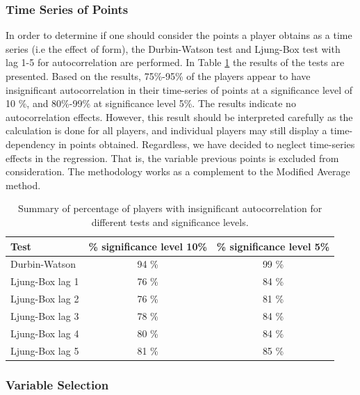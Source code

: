\subsubsection{Time Series of Points}

In order to determine if one should consider the points a player obtains as a time series (i.e the effect of form), the Durbin-Watson test and Ljung-Box test with lag 1-5 for autocorrelation are performed. In Table \ref{tab:auto_tests} the results of the tests are presented. Based on the results, 75\%-95\% of the players appear to have insignificant autocorrelation in their time-series of points at a significance level of 10 \%, and 80\%-99\% at significance level 5\%. The results indicate no autocorrelation effects. However, this result should be interpreted carefully as the calculation is done for all players, and individual players may still display a time-dependency in points obtained. Regardless, we have decided to neglect time-series effects in the regression. That is, the variable previous points is excluded from consideration. The methodology works as a complement to the Modified Average method.

\begin{table}[H]
\centering
\begin{tabular}{|l|c|c|}
\hline
Test            & \% significance level 10\% & \% significance level 5\% \\
\hline
Durbin-Watson   & 94 \% & 99 \%                                            \\
Ljung-Box lag 1 & 76 \% & 84 \%                                            \\
Ljung-Box lag 2 & 76 \% & 81 \%                                            \\
Ljung-Box lag 3 & 78 \% & 84 \%                                            \\
Ljung-Box lag 4 & 80 \% & 84 \%                                           \\
Ljung-Box lag 5 & 81 \% & 85 \%                
\\
\hline
\end{tabular}
\caption{Summary of percentage of players with insignificant autocorrelation for different tests and significance levels.}
\label{tab:auto_tests}
\end{table}

\subsubsection{Variable Selection}

